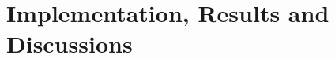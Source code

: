 \documentclass[a4paper,12pt,oneside]{book}
\begin{document}

\chapter{\textbf{Implementation, Results and Discussions}} \label{chap:results_disc}
\end{document}
